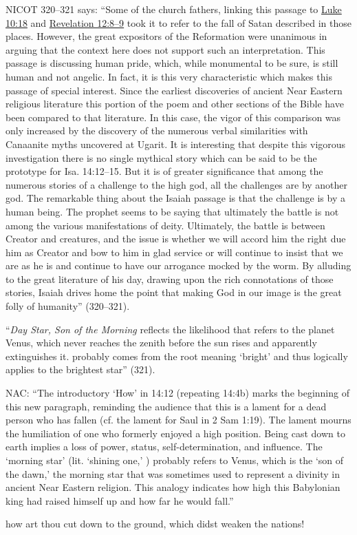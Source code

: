 {					NICOT 320--321 says: ``Some of the church fathers, linking this passage to \hyperref[LUKE-10-18]{Luke 10:18} and \hyperref[REVELATIONNT-12-8]{Revelation 12:8--9} took it to refer to the fall of Satan described in those places. However, the great expositors of the Reformation were unanimous in arguing that the context here does not support such an interpretation. This passage is discussing human pride, which, while monumental to be sure, is still human and not angelic. In fact, it is this very characteristic which makes this passage of special interest. Since the earliest discoveries of ancient Near Eastern religious literature this portion of the poem and other sections of the Bible have been compared to that literature. In this case, the vigor of this comparison was only increased by the discovery of the numerous verbal similarities with Canaanite myths uncovered at Ugarit. It is interesting that despite this vigorous investigation there is no single mythical story which can be said to be the prototype for Isa. 14:12--15. But it is of greater significance that among the numerous stories of a challenge to the high god, all the challenges are by another god. The remarkable thing about the Isaiah passage is that the challenge is by a human being. The prophet seems to be saying that ultimately the battle is not among the various manifestations of deity. Ultimately, the battle is between Creator and creatures, and the issue is whether we will accord him the right due him as Creator and bow to him in glad service or will continue to insist that we are as he is and continue to have our arrogance mocked by the worm. By alluding to the great literature of his day, drawing upon the rich connotations of those stories, Isaiah drives home the point that making God in our image is the great folly of humanity'' (320--321).
					
					``\textit{Day Star, Son of the Morning} reflects the likelihood that  refers to the planet Venus, which never reaches the zenith before the sun rises and apparently extinguishes it. probably comes from the root meaning `bright' and thus logically applies to the brightest star'' (321).
					
					NAC: ``The introductory `How'  in 14:12 (repeating 14:4b) marks the beginning of this new paragraph, reminding the audience that this is a lament for a dead person who has fallen (cf. the lament for Saul in 2 Sam 1:19). The lament mourns the humiliation of one who formerly enjoyed a high position. Being cast down to earth implies a loss of power, status, self-determination, and influence. The `morning star' (lit. `shining one,' ) probably refers to Venus, which is the `son of the dawn,' the morning star that was sometimes used to represent a divinity in ancient Near Eastern religion. This analogy indicates how high this Babylonian king had raised himself up and how far he would fall.''
				}
			how art thou cut down to the ground, which didst weaken the nations!

